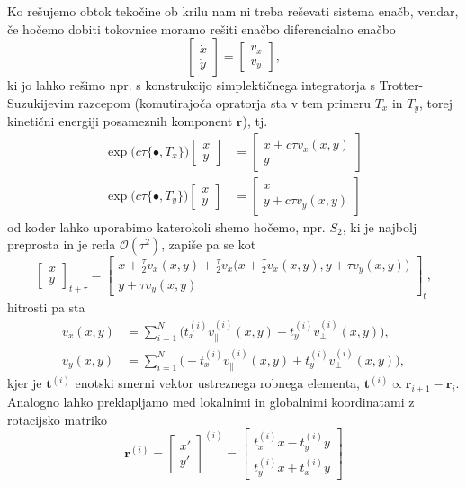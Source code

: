 \documentclass[a4 paper, 12pt]{article}
\renewcommand{\r}{
	\ensuremath{\mathbf{r}}
}
\begin{document}
Ko re\v sujemo obtok teko\v cine ob krilu nam ni treba re\v sevati sistema ena\v cb, vendar, \v ce ho\v cemo
dobiti tokovnice moramo re\v siti ena\v cbo diferencialno ena\v cbo
\[
	\begin{bmatrix} \dot{x} \\ \dot{y}\end{bmatrix} = \begin{bmatrix} v_x \\ v_y \end{bmatrix},
\]
ki jo lahko re\v simo npr. s konstrukcijo simplekti\v cnega integratorja s Trotter-Suzukijevim razcepom
(komutirajo\v ca opratorja sta v tem primeru $T_x$ in $T_y$, torej kineti\v cni energiji posameznih
komponent $\r$), tj.
\begin{align*}
	\exp\big(c\tau\{\bullet, T_x\}\big) \begin{bmatrix} x \\ y \end{bmatrix} &= \begin{bmatrix} x
		+ c\tau v_x (x,y) \\ y \end{bmatrix} \\
	\exp\big(c\tau\{\bullet, T_y\}\big) \begin{bmatrix} x \\ y \end{bmatrix} &= \begin{bmatrix} x \\ y
		+ c\tau v_y (x, y) \end{bmatrix}
\end{align*}
od koder lahko uporabimo katerokoli shemo ho\v cemo, npr. $S_2$, ki je najbolj preprosta in je reda
$\mathcal{O}(\tau^2)$, zapi\v se pa se kot
\[
	\begin{bmatrix}
		x \\ y
	\end{bmatrix}_{t + \tau} = \begin{bmatrix}
		x + \frac{\tau}{2} v_x (x,y) + \frac{\tau}{2}v_x\big(x + \frac{\tau}{2} v_x(x,y), y +
			\tau v_y (x,y)\big) \\
		y + \tau v_y (x,y)
	\end{bmatrix}_t,
\]
hitrosti pa sta
\begin{align*}
	v_x (x,y) &= \sum_{i = 1}^N \big(t_x^{(i)} v_\parallel^{(i)}(x,y) + t_y^{(i)}v_\perp^{(i)}(x,y)\big), \\
	v_y (x,y) &= \sum_{i = 1}^N \big(-t_x^{(i)} v_\parallel^{(i)}(x,y) + t_y^{(i)}v_\perp^{(i)}(x,y)\big),
\end{align*}
kjer je $\mathbf{t}^{(i)}$ enotski smerni vektor ustreznega robnega elementa,
$\mathbf{t}^{(i)} \propto \r_{i+1} - \r_i$. Analogno lahko preklapljamo med lokalnimi in globalnimi
koordinatami z rotacijsko matriko
\[
	\r^{(i)} = \begin{bmatrix} x' \\ y' \end{bmatrix}^{(i)} = \begin{bmatrix} t_x^{(i)} x - t_y^{(i)}y \\
		t_y^{(i)} x + t_x^{(i)} y \end{bmatrix}
\]
\end{document}

